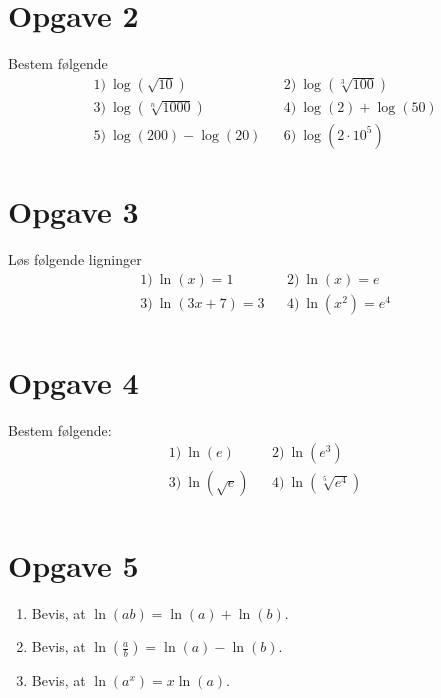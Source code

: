 \section*{Opgave 2}
Bestem følgende 
\begin{align*}
&1) \ \log(\sqrt{10})    &&2) \  \log(\sqrt[3]{100})  \\
&3) \ \log(\sqrt[n]{1000})   &&4) \ \log(2) + \log(50)    \\
&5) \ \log(200)-\log(20)   &&6) \ \log(2\cdot 10^5)   
\end{align*}

\section*{Opgave 3}
Løs følgende ligninger
\begin{align*}
&1) \ \ln(x)=1   &&2) \ \ln(x)=e    \\
&3) \ \ln(3x+7) = 3   &&4) \  \ln(x^2) = e^4   \\
\end{align*}
\section*{Opgave 4}
Bestem følgende:
\begin{align*}
&1) \  \ln(e)  &&2) \  \ln(e^3)    \\
&3) \  \ln(\sqrt{e})  &&4) \ \ln(\sqrt[5]{e^4})      \\
\end{align*}


\section*{Opgave 5}
\begin{enumerate}[label=\roman*)]
\item Bevis, at  $\ln(ab) = \ln(a)+\ln(b).$
\item Bevis, at  $\ln(\frac{a}{b}) = \ln(a)-\ln(b)$.
\item Bevis, at  $\ln(a^x) = x\ln(a)$.
\end{enumerate}

